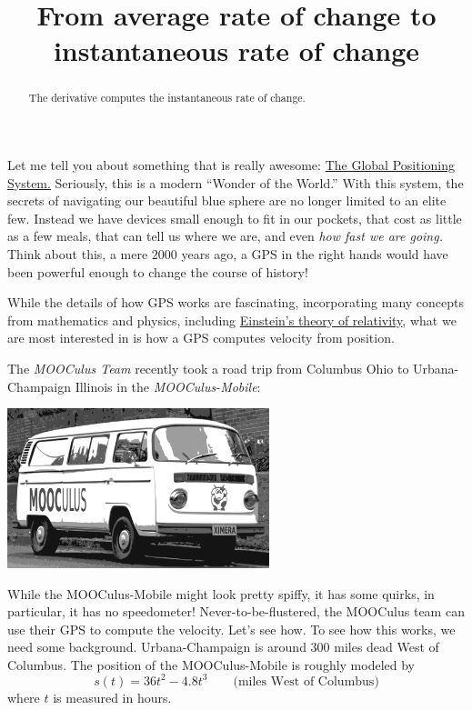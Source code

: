 \documentclass{ximera}
\title{From average rate of change to instantaneous rate of change}
\begin{document}
\begin{abstract}
The derivative computes the instantaneous rate of change. 
\end{abstract}
\maketitle



Let me tell you about something that is really awesome:
\href{http://en.wikipedia.org/wiki/Global_Positioning_System}{The
  Global Positioning System.} Seriously, this is a modern ``Wonder of
the World.'' With this system, the secrets of navigating our beautiful
blue sphere are no longer limited to an elite few. Instead we have
devices small enough to fit in our pockets, that cost as little as a
few meals, that can tell us where we are, and even \textit{how fast we
  are going.} Think about this, a mere $2000$ years ago, a GPS in the
right hands would have been powerful enough to change the course of
history!

While the details of how GPS works are fascinating, incorporating many
concepts from mathematics and physics, including
\href{relativisticEffectsInTheGlobalPositioningSystem.pdf}{Einstein's
  theory of relativity}, what we are most interested in is how a GPS
computes velocity from position.

The \textit{MOOCulus Team} recently took a road trip from Columbus
Ohio to Urbana-Champaign Illinois in the \textit{MOOCulus-Mobile}:
\begin{image}
\includegraphics[width=3in]{mooculusMobile.pdf}
\end{image}
While the MOOCulus-Mobile might look pretty spiffy, it has some
quirks, in particular, it has no speedometer!  Never-to-be-flustered,
the MOOCulus team can use their GPS to compute the velocity. Let's see
how. To see how this works, we need some background. Urbana-Champaign
is around $300$ miles dead West of Columbus. The position of the
MOOCulus-Mobile is roughly modeled by
\[
s(t) = 36t^2 -4.8t^3 \qquad\text{(miles West of Columbus)} %
\]
where $t$ is measured in hours. 
\end{document}
